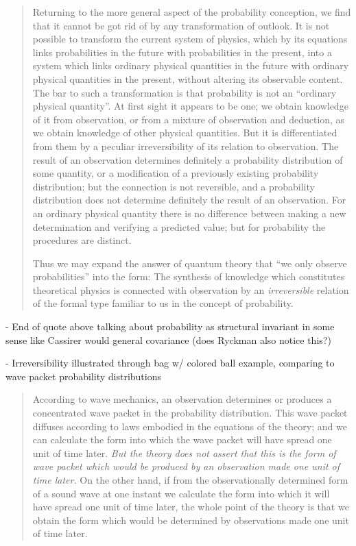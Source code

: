 \begin{quote}
    Returning to the more general aspect of the probability conception, we find that it cannot be got rid of by any transformation of outlook.  It is not possible to transform the current system of physics, which by its equations links probabilities in the future with probabilities in the present, into a system which links ordinary physical quantities in the future with ordinary physical quantities in the present, without altering its observable content.  The bar to such a transformation is that probability is not an ``ordinary physical quantity''.  At first sight it appears to be one; we obtain knowledge of it from observation, or from a mixture of observation and deduction, as we obtain knowledge of other physical quantities.  But it is differentiated from them by a peculiar irreversibility of its relation to observation.  The result of an observation determines definitely a probability distribution of some quantity, or a modification of a previously existing probability distribution; but the connection is not reversible, and a probability distribution does not determine definitely the result of an observation.  For an ordinary physical quantity there is no difference between making a new determination and verifying a predicted value; but for probability the procedures are distinct.  

    Thus we may expand the answer of quantum theory that ``we only observe probabilities'' into the form: The synthesis of knowledge which constitutes theoretical physics is connected with observation by an \emph{irreversible} relation of the formal type familiar to us in the concept of probability.
    \citep[p. 90-91]{Eddington1939}
\end{quote}

- End of quote above talking about probability as structural invariant in some sense like Cassirer would general covariance (does Ryckman also notice this?)

- Irreversibility illustrated through bag w/ colored ball example, comparing to wave packet probability distributions

\begin{quote}
    According to wave mechanics, an observation determines or produces a concentrated wave packet in the probability distribution.  This wave packet diffuses according to laws embodied in the equations of the theory; and we can calculate the form into which the wave packet will have spread one unit of time later.  \emph{But the theory does not assert that this is the form of wave packet which would be produced by an observation made one unit of time later.}  On the other hand, if from the observationally determined form of a sound wave at one instant we calculate the form into which it will have spread one unit of time later, the whole point of the theory is that we obtain the form which would be determined by observations made one unit of time later.  \citep[p. 93]{Eddington1939}
\end{quote}

